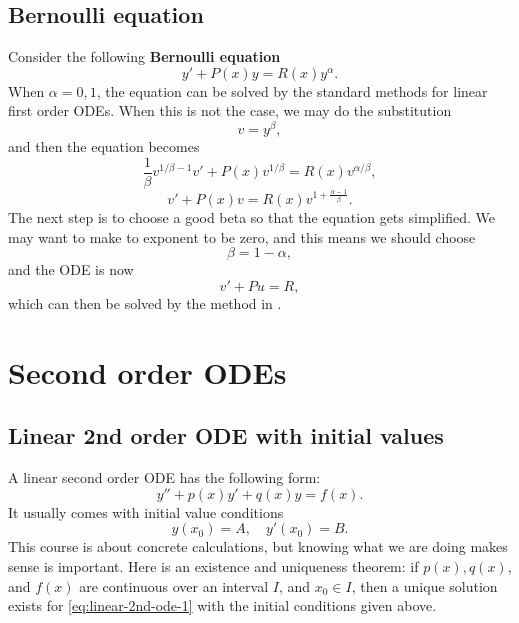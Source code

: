 \documentclass[hyperref, a4paper]{article}
\newcommand*{\concept}[1]{{\textbf{#1}}}
\begin{document}
\subsection{Bernoulli equation}

Consider the following \concept{Bernoulli equation}  
\begin{equation}
    y' + P(x) y = R(x) y^\alpha.
\end{equation}
When $\alpha = 0, 1$, 
the equation can be solved by the standard methods 
for linear first order ODEs.
When this is not the case, 
we may do the substitution 
\begin{equation}
    v = y^\beta,
\end{equation}
and then the equation becomes 
\[
    \frac{1}{\beta} v^{1/\beta - 1} v' + P(x) v^{1/\beta} 
    = R(x) v^{\alpha / \beta},
\]
\begin{equation}
    v' + P(x) v = R(x) v^{1 + \frac{\alpha - 1}{\beta}}.
\end{equation}
The next step is to choose a good beta so that 
the equation gets simplified.
We may want to make to exponent to be zero, 
and this means we should choose 
\begin{equation}
    \beta = 1 - \alpha,
\end{equation}
and the ODE is now 
\begin{equation}
    v' + Pu = R,
\end{equation}
which can then be solved by the method in  
.

\section{Second order ODEs}

\subsection{Linear 2nd order ODE with initial values}

A linear second order ODE has the following form:
\begin{equation}
    y'' + p(x) y' + q(x) y = f(x).
    \label{eq:linear-2nd-ode-1}
\end{equation}
It usually comes with initial value conditions 
\begin{equation}
    y(x_0) = A, \quad y'(x_0) = B.
\end{equation}
This course is about concrete calculations,
but knowing what we are doing makes sense is important.
Here is an existence and uniqueness theorem:
if $p(x), q(x)$, and $f(x)$ are continuous 
over an interval $I$,
and $x_0 \in I$, 
then a unique solution exists for \eqref{eq:linear-2nd-ode-1}
with the initial conditions given above.
\end{document}
